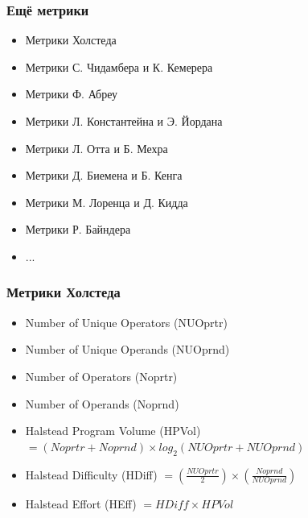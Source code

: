 \documentclass{../../slides-style}
\begin{document}
    \begin{frame}
        \frametitle{Ещё метрики}
        \begin{itemize}
            \item Метрики Холстеда
            \item Метрики С. Чидамбера и К. Кемерера
            \item Метрики Ф. Абреу
            \item Метрики Л. Константейна и Э. Йордана
            \item Метрики Л. Отта и Б. Мехра
            \item Метрики Д. Биемена и Б. Кенга
            \item Метрики М. Лоренца и Д. Кидда
            \item Метрики Р. Байндера
            \item ...
        \end{itemize}
    \end{frame}

    \begin{frame}
        \frametitle{Метрики Холстеда}
        \begin{itemize}
            \item Number of Unique Operators (NUOprtr)
            \item Number of Unique Operands (NUOprnd)
            \item Number of Operators (Noprtr)
            \item Number of Operands (Noprnd)
            \item Halstead Program Volume (HPVol) $= (Noprtr + Noprnd) \times log_2(NUOprtr + NUOprnd)$
            \item Halstead Difficulty (HDiff) $= (\frac{NUOprtr}{2}) \times (\frac{Noprnd}{NUOprnd})$
            \item Halstead Effort (HEff) $= HDiff \times HPVol$
        \end{itemize}
    \end{frame}
\end{document}
